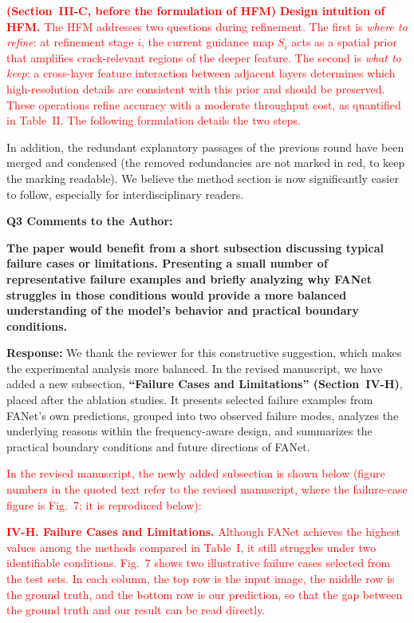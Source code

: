 \documentclass[letterpaper,journal,onecolumn,12pt]{IEEEtran}
\begin{document}
\textcolor{red}{
\textbf{(Section~III-C, before the formulation of HFM)}
\textbf{Design intuition of HFM.} The HFM addresses two questions during refinement. The first is \emph{where to
refine}: at refinement stage $i$, the current guidance map $S_i$ acts as a spatial prior that amplifies
crack-relevant regions of the deeper feature. The second is \emph{what to keep}: a cross-layer feature interaction between
adjacent layers determines which high-resolution details are consistent with this prior and should be preserved.
These operations refine accuracy with a moderate throughput cost, as quantified in Table~II. The following
formulation details the two steps.
}

In addition, the redundant explanatory passages of the previous round have been merged and condensed (the removed
redundancies are not marked in red, to keep the marking readable). We believe the method section is now
significantly easier to follow, especially for interdisciplinary readers.\\[10pt]



{\color{BlueGreen} \textbf{Q3 Comments to the Author:}

\textbf{The paper would benefit from a short subsection discussing typical failure cases or limitations. Presenting a
small number of representative failure examples and briefly analyzing why FANet struggles in those conditions would
provide a more balanced understanding of the model's behavior and practical boundary conditions.}}

\textbf{Response:}
We thank the reviewer for this constructive suggestion, which makes the experimental analysis more balanced.
In the revised manuscript, we have added a new subsection, \textbf{``Failure Cases and Limitations''
 (Section~IV-H)}, placed after the ablation studies. It presents selected failure examples from FANet's own
predictions, grouped into two observed failure modes, analyzes
the underlying reasons within the frequency-aware design, and summarizes the practical boundary conditions and future
directions of FANet.

\textcolor{red}{In the revised manuscript, the newly added subsection is shown below (figure numbers in the quoted text refer to the revised manuscript, where the failure-case figure is Fig.~7; it is reproduced below):}

\textcolor{red}{
\textbf{IV-H. Failure Cases and Limitations.}
Although FANet achieves the highest values among the methods compared in Table~I, it still struggles under two identifiable
conditions. Fig.~7 shows two illustrative failure cases selected from the test sets. In each column, the top row is the input
image, the middle row is the ground truth, and the bottom row is our prediction, so that the gap between the ground
truth and our result can be read directly.
}
\end{document}
